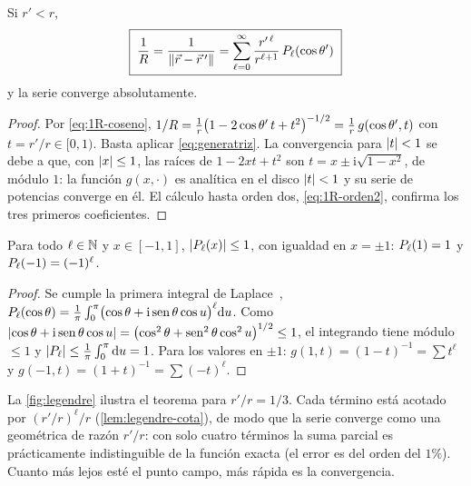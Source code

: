 \begin{teorema}\label{teo:1R-legendre}
Si $r'<r$,
\begin{equation}\label{eq:1R-legendre}
  \boxed{\;\frac{1}{R}=\frac{1}{\lVert \vec{r}-\vec{r}\,'\rVert}=\sum_{\ell=0}^{\infty}\frac{r'^{\,\ell}}{r^{\ell+1}}\,P_{\ell}(\cos\theta')\;}
\end{equation}
y la serie converge absolutamente.
\end{teorema}
\begin{proof}
Por \cref{eq:1R-coseno}, $1/R=\frac1r\bigl(1-2\cos\theta'\,t+t^{2}\bigr)^{-1/2}=\frac1r\,g(\cos\theta',t)$ con $t=r'/r\in[0,1)$. Basta aplicar \cref{eq:generatriz}. La convergencia
para $\lvert t\rvert<1$ se debe a que, con $\lvert x\rvert\le1$, las raíces de $1-2xt+t^{2}$ son $t=x\pm\mathrm{i}\sqrt{1-x^{2}}$, de módulo $1$: la función $g(x,\cdot)$ es analítica en el disco
$\lvert t\rvert<1$ y su serie de potencias converge en él. El cálculo hasta orden dos, \cref{eq:1R-orden2}, confirma los tres primeros coeficientes.
\end{proof}

\begin{lema}\label{lem:legendre-cota}
Para todo $\ell\in\mathbb{N}$ y $x\in[-1,1]$, $\lvert P_{\ell}(x)\rvert\le1$, con igualdad en $x=\pm1$: $P_{\ell}(1)=1$ y $P_{\ell}(-1)=(-1)^{\ell}$.
\end{lema}
\begin{proof}
Se cumple la primera integral de Laplace~\cite{ARFKEN}, $P_{\ell}(\cos\theta)=\frac{1}{\pi}\int_{0}^{\pi}\bigl(\cos\theta+\mathrm{i}\operatorname{sen}\theta\cos u\bigr)^{\ell}\mathrm{d} u$. Como
$\lvert \cos\theta+\mathrm{i}\operatorname{sen}\theta\cos u\rvert=\bigl(\cos^{2}\theta+\operatorname{sen}^{2}\theta\cos^{2}u\bigr)^{1/2}\le1$, el integrando tiene módulo $\le1$ y
$\lvert P_{\ell}\rvert\le\frac1\pi\int_0^\pi\mathrm{d} u=1$. Para los valores en $\pm1$: $g(1,t)=(1-t)^{-1}=\sum t^{\ell}$ y $g(-1,t)=(1+t)^{-1}=\sum(-t)^{\ell}$.
\end{proof}



\begin{observacion}\label{obs:convergencia}
La \cref{fig:legendre} ilustra el teorema para $r'/r=1/3$. Cada término está acotado por $(r'/r)^{\ell}/r$ (\cref{lem:legendre-cota}), de modo que la serie
converge como una geométrica de razón $r'/r$: con solo cuatro términos la suma parcial es prácticamente indistinguible de la función exacta (el error es del orden del $1\%$). Cuanto más lejos esté el
punto campo, más rápida es la convergencia.
\end{observacion}

